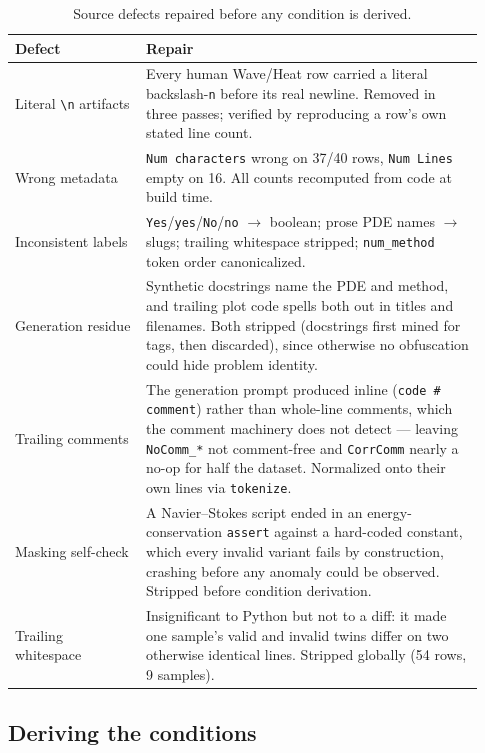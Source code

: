 \documentclass[11pt]{article}
\begin{document}
\begin{table}[h]
\centering
\small
\begin{tabular}{@{}p{0.26\linewidth}p{0.67\linewidth}@{}}
\toprule
Defect & Repair \\
\midrule
Literal \texttt{\textbackslash n} artifacts &
Every human Wave/Heat row carried a literal backslash-\texttt{n} before its real newline.
Removed in three passes; verified by reproducing a row's own stated line count. \\
Wrong metadata &
\texttt{Num characters} wrong on 37/40 rows, \texttt{Num Lines} empty on 16. All counts
recomputed from code at build time. \\
Inconsistent labels &
\texttt{Yes}/\texttt{yes}/\texttt{No}/\texttt{no} $\to$ boolean; prose PDE names $\to$ slugs;
trailing whitespace stripped; \texttt{num\_method} token order canonicalized. \\
Generation residue &
Synthetic docstrings name the PDE and method, and trailing plot code spells both out in
titles and filenames. Both stripped (docstrings first mined for tags, then discarded), since
otherwise no obfuscation could hide problem identity. \\
Trailing comments &
The generation prompt produced inline (\texttt{code~\# comment}) rather than whole-line
comments, which the comment machinery does not detect --- leaving \texttt{NoComm\_*} not
comment-free and \texttt{CorrComm} nearly a no-op for half the dataset. Normalized onto their
own lines via \texttt{tokenize}. \\
Masking self-check &
A Navier--Stokes script ended in an energy-conservation \texttt{assert} against a hard-coded
constant, which every invalid variant fails by construction, crashing before any anomaly
could be observed. Stripped before condition derivation. \\
Trailing whitespace &
Insignificant to Python but not to a diff: it made one sample's valid and invalid twins
differ on two otherwise identical lines. Stripped globally (54 rows, 9 samples). \\
\bottomrule
\end{tabular}
\caption{Source defects repaired before any condition is derived.}
\label{tab:repairs}
\end{table}

\subsection{Deriving the conditions}
\end{document}
